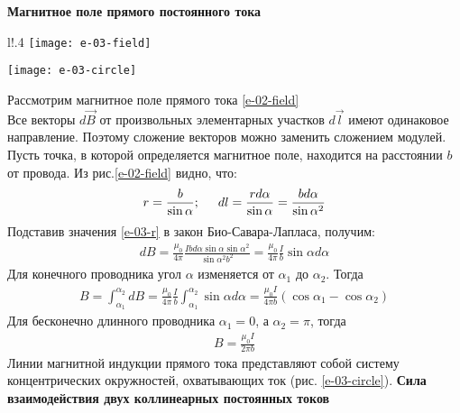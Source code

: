 \documentclass[__main__.tex]{subfiles}
\begin{document}
\textbf{Магнитное поле прямого постоянного тока}\\
\begin{wrapfigure}{l!}{.4\linewidth}
	\texttt{[image: e-03-field]}
	\caption{Магнитное поле прямого тока}
	\label{e-02-field}
	\texttt{[image: e-03-circle]}
	\caption{Силовые линии}
	\label{e-03-circle}
\end{wrapfigure}
Рассмотрим магнитное поле прямого тока	\ref{e-02-field}\\
Все векторы $d\vec{B}$ от произвольных элементарных участков $d\vec{l}$ имеют одинаковое направление. Поэтому сложение векторов можно заменить сложением модулей.\\
Пусть точка, в которой определяется магнитное поле, находится на расстоянии $b$ от провода. Из рис.\ref{e-02-field} видно, что:
\begin{gather}
	r = \frac{b}{\sin{\alpha}}; \hspace{0.5cm} dl = \frac{rd\alpha}{\sin{\alpha}} = \frac{bd\alpha}{\sin{\alpha}^2}
	\label{e-03-r}
\end{gather}
Подставив значения \ref{e-03-r} в закон Био-Савара-Лапласа, получим:
\begin{gather*}
	dB = \frac{\mu_0}{4\pi}\frac{Ibd\alpha\sin{\alpha}\sin{\alpha}^2}{\sin{\alpha}^2b^2} = \frac{\mu_0}{4\pi}\frac{I}{b}\sin{\alpha}d\alpha
\end{gather*}
Для конечного проводника угол $\alpha$ изменяется от $\alpha_1$ до $\alpha_2$. Тогда 
\begin{gather*}
	B = \int_{\alpha_1}^{\alpha_2}{dB} = \frac{\mu_0}{4\pi}\frac{I}{b} \int_{\alpha_1}^{\alpha_2}{\sin{\alpha}d\alpha} = \frac{\mu_0I}{4\pi b}(\cos{\alpha_1} - \cos{\alpha_2})
\end{gather*}
Для бесконечно длинного проводника $\alpha_1 = 0$, а $\alpha_2 = \pi$, тогда
\begin{gather*}
	B = \frac{\mu_0I}{2\pi b}
\end{gather*}
Линии магнитной индукции прямого тока представляют собой систему концентрических окружностей, охватывающих ток (рис. \ref{e-03-circle}).
\newpage
\textbf{Сила взаимодействия двух коллинеарных постоянных токов}\\
\end{document}
